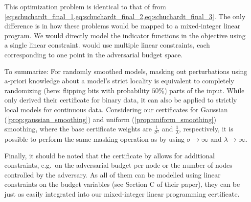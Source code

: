 This optimization problem is identical to that of \citet{Schuchardt2021} from \cref{eq:schuchardt_final_1,eq:schuchardt_final_2,eq:schuchardt_final_3}.
The only difference is in how these problems would be mapped to a mixed-integer linear program.
We would directly model the indicator functions in the objective using a single linear constraint.
\citet{Schuchardt2021} would use multiple linear constraints, each corresponding to one point in the adversarial budget space.

To summarize: For randomly smoothed models, masking out perturbations using a-priori knowledge about a model's strict locality
is equivalent to completely randomizing (here: flipping bits with probability $50\%$) parts of the input.
While \citet{Schuchardt2021} only derived their certificate for binary data, it can also be applied to strictly local models for continuous data.
Considering our certificates for Gaussian (\cref{prop:gaussian_smoothing}) and  uniform (\cref{prop:uniform_smoothing}) smoothing, where the base certificate weights are $\frac{1}{\sigma^2}$ and $\frac{1}{\lambda}$, respectively,
it is possible to perform the same masking operation as \citet{Schuchardt2021} by using $\sigma \to \infty$ and $\lambda \to \infty$.

Finally, it should be noted that the certificate by \citet{Schuchardt2021} allows for additional constraints, e.g.~on the adversarial budget per node or the number of nodes controlled by the adversary.
As all of them can be modelled using linear constraints on the budget variables (see Section C of their paper), they can be just as easily integrated into our mixed-integer linear programming certificate.





